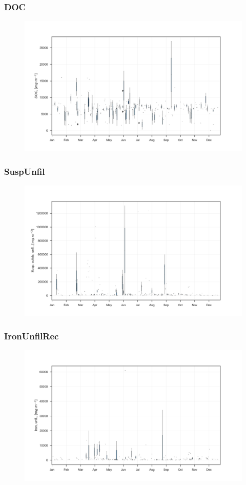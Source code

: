 \documentclass{beamer}
\begin{document}
\begin{frame}
\frametitle{DOC}
\begin{figure}
\includegraphics[width=\textwidth]{rivers/all/1yr_boxpl/DOC.png}
\end{figure}
\end{frame}

\begin{frame}
\frametitle{SuspUnfil}
\begin{figure}
\includegraphics[width=\textwidth]{rivers/all/1yr_boxpl/SuspUnfil.png}
\end{figure}
\end{frame}

\begin{frame}
\frametitle{IronUnfilRec}
\begin{figure}
\includegraphics[width=\textwidth]{rivers/all/1yr_boxpl/IronUnfilRec.png}
\end{figure}
\end{frame}
\end{document}
